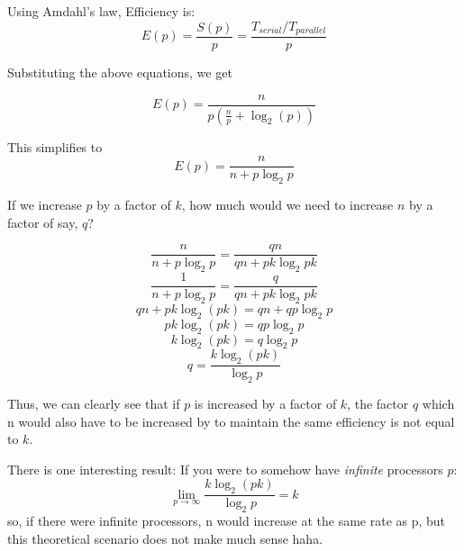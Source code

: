 \documentclass[letterpaper]{article}
\begin{document}
Using Amdahl's law, Efficiency is:
\begin{equation*}
E(p) = \frac{S(p)}{p} = \frac{T_{serial}/T_{parallel}}{p}
\end{equation*}

Substituting the above equations, we get

\[E(p) = \frac{n}{p (\frac{n}{p} + \log_2 (p)) } \]

This simplifies to
\[ E(p) = \frac{n}{n + p \log_2 p} \]

If we increase \(p\) by a factor of \(k\), how much would we need to increase \(n\) by a factor of say, \(q\)?

\[
 \frac{n}{n + p \log_2 p} = \frac{qn}{qn + pk \log_2 pk}
\]
\[
 \frac{1}{n + p \log_2 p} = \frac{q}{qn + pk \log_2 pk}
\]
\[
 qn + pk \log_2(pk) = qn + qp\log_2 p
\]
\[
 pk \log_2(pk) =  qp\log_2 p
\]
\[
 k \log_2(pk) =  q\log_2 p
\]
\[
 q = \frac{k \log_2(pk)}{\log_2 p}
\]


Thus, we can clearly see that if \(p\) is increased by a factor of \(k\),
the factor \(q\) which n would also have to be increased by to maintain the same efficiency is not equal to \(k\).


There is one interesting result: If you were to somehow have \emph{infinite} processors \(p\):
\[ \lim_{p \to \infty } \frac{k \log_2 (pk)}{\log_2 p} = k\]
so, if there were infinite processors, n would increase at the same rate as p, but this theoretical scenario does not make much sense haha.
\end{document}
